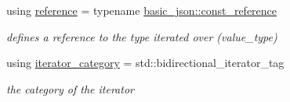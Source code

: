\begin{DoxyCompactItemize}
using \hyperlink{classnlohmann_1_1basic__json_1_1const__iterator_aefd248cac6493eed1e6ff53ba6a63eb2}{reference} = typename \hyperlink{classnlohmann_1_1basic__json_af677a29b0e66edc9f66e5167e4667071}{basic\+\_\+json\+::const\+\_\+reference}
\begin{DoxyCompactList}\small\item\em defines a reference to the type iterated over (value\+\_\+type) \end{DoxyCompactList}\item 
\hypertarget{classnlohmann_1_1basic__json_1_1const__iterator_a821560d64f50525162097f19b1392e7f}{}\label{classnlohmann_1_1basic__json_1_1const__iterator_a821560d64f50525162097f19b1392e7f} 
using \hyperlink{classnlohmann_1_1basic__json_1_1const__iterator_a821560d64f50525162097f19b1392e7f}{iterator\+\_\+category} = std\+::bidirectional\+\_\+iterator\+\_\+tag
\begin{DoxyCompactList}\small\item\em the category of the iterator \end{DoxyCompactList}\end{DoxyCompactItemize}

